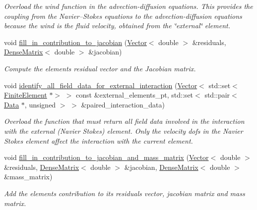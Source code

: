 \begin{DoxyCompactItemize}
\begin{DoxyCompactList}\small\item\em Overload the wind function in the advection-\/diffusion equations. This provides the coupling from the Navier--Stokes equations to the advection-\/diffusion equations because the wind is the fluid velocity, obtained from the \char`\"{}external\char`\"{} element. \end{DoxyCompactList}\item 
void \hyperlink{classoomph_1_1RefineableAdvectionDiffusionBoussinesqElement_a89bbdff66fd1fe24f4ae1d681a88d583}{fill\+\_\+in\+\_\+contribution\+\_\+to\+\_\+jacobian} (\hyperlink{classoomph_1_1Vector}{Vector}$<$ double $>$ \&residuals, \hyperlink{classoomph_1_1DenseMatrix}{Dense\+Matrix}$<$ double $>$ \&jacobian)
\begin{DoxyCompactList}\small\item\em Compute the element\textquotesingle{}s residual vector and the Jacobian matrix. \end{DoxyCompactList}\item 
void \hyperlink{classoomph_1_1RefineableAdvectionDiffusionBoussinesqElement_abb212175a68a9686ead329ba9fa330f6}{identify\+\_\+all\+\_\+field\+\_\+data\+\_\+for\+\_\+external\+\_\+interaction} (\hyperlink{classoomph_1_1Vector}{Vector}$<$ std\+::set$<$ \hyperlink{classoomph_1_1FiniteElement}{Finite\+Element} $\ast$$>$ $>$ const \&external\+\_\+elements\+\_\+pt, std\+::set$<$ std\+::pair$<$ \hyperlink{classoomph_1_1Data}{Data} $\ast$, unsigned $>$ $>$ \&paired\+\_\+interaction\+\_\+data)
\begin{DoxyCompactList}\small\item\em Overload the function that must return all field data involved in the interaction with the external (Navier Stokes) element. Only the velocity dofs in the Navier Stokes element affect the interaction with the current element. \end{DoxyCompactList}\item 
void \hyperlink{classoomph_1_1RefineableAdvectionDiffusionBoussinesqElement_a25627bf0853bda6c520a2b1c2c602af4}{fill\+\_\+in\+\_\+contribution\+\_\+to\+\_\+jacobian\+\_\+and\+\_\+mass\+\_\+matrix} (\hyperlink{classoomph_1_1Vector}{Vector}$<$ double $>$ \&residuals, \hyperlink{classoomph_1_1DenseMatrix}{Dense\+Matrix}$<$ double $>$ \&jacobian, \hyperlink{classoomph_1_1DenseMatrix}{Dense\+Matrix}$<$ double $>$ \&mass\+\_\+matrix)
\begin{DoxyCompactList}\small\item\em Add the element\textquotesingle{}s contribution to its residuals vector, jacobian matrix and mass matrix. \end{DoxyCompactList}\item 
$$
\end{DoxyCompactItemize}
